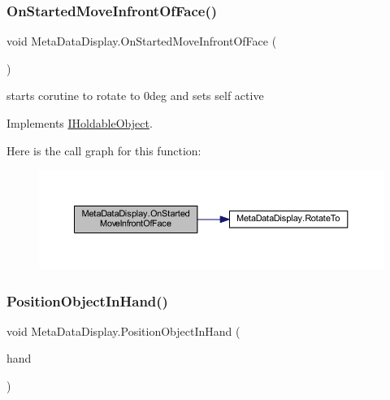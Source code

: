 \subsubsection{\texorpdfstring{On\+Started\+Move\+Infront\+Of\+Face()}{OnStartedMoveInfrontOfFace()}}
{\footnotesize\ttfamily void Meta\+Data\+Display.\+On\+Started\+Move\+Infront\+Of\+Face (\begin{DoxyParamCaption}{ }\end{DoxyParamCaption})}



starts corutine to rotate to 0deg and sets self active 



Implements \mbox{\hyperlink{interface_i_holdable_object_af5dcdd5524539104706dadd8a0e15e08}{I\+Holdable\+Object}}.

Here is the call graph for this function\+:
\nopagebreak
\begin{figure}[H]
\begin{center}
\leavevmode
\includegraphics[width=350pt]{class_meta_data_display_aa0a9b9ca8243943104c82602e69a0541_cgraph}
\end{center}
\end{figure}
\mbox{\label{class_meta_data_display_a1ecbc336a25464fc9999120066263e2a}} 
\subsubsection{\texorpdfstring{Position\+Object\+In\+Hand()}{PositionObjectInHand()}}
{\footnotesize\ttfamily void Meta\+Data\+Display.\+Position\+Object\+In\+Hand (\begin{DoxyParamCaption}\item[{\mbox{\hyperlink{class_player_hand}{Player\+Hand}}}]{hand }\end{DoxyParamCaption})}



